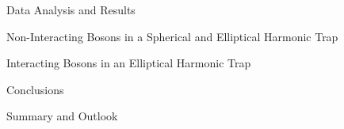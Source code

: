 \documentclass[twoside,english, a4paper, 11pt]{shared/fysbachelor}
\begin{document}
\begin{part}{Data Analysis and Results}
	\label{part:results}
	\begin{chapter}{Non-Interacting Bosons in a Spherical and Elliptical Harmonic Trap}
	
	\end{chapter}
	
	\begin{chapter}{Interacting Bosons in an Elliptical Harmonic Trap}
	
	\end{chapter}
\end{part}
 
\begin{part}{Conclusions}
	\label{part:conclusion}
	\begin{chapter}{Summary and Outlook}
		\label{chap:conclusion}
		
	\end{chapter}	
\end{part}

\cleardoublepage





%	
	
%
\printbibliography

 
 
\end{document}

